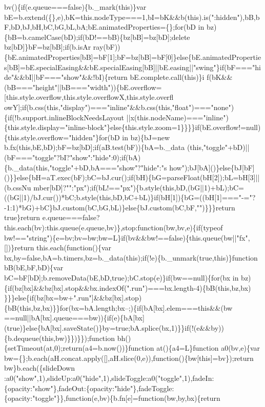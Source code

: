 \begin{DoxyCode}
{       bv()\{if(e.queue===false)\{b.\_mark(this)\}var
       bE=b.extend(\{\},e),bK=this.nodeType===1,bI=bK&&b(this).is(":hidden"),bB,bF,bD,bJ,bH,bC,bG,bL,bA;bE.animatedProperties=\{\};for(bD in bz)\{bB=b.camelCase(bD);if(bD!==bB)\{bz[bB]=bz[bD];delete
       bz[bD]\}bF=bz[bB];if(b.isAr
      ray(bF))\{bE.animatedProperties[bB]=bF[1];bF=bz[bB]=bF[0]\}else\{bE.animatedProperties[bB]=bE.specialEasing&&bE.specialEasing[bB]||bE.easing||"swing"\}if(bF==="hide"&&bI||bF==="show"&&!bI)\{return
       bE.complete.call(this)\}i
      f(bK&&(bB==="height"||bB==="width"))\{bE.overflow=[this.style.overflow,this.style.overflowX,this.style.overfl
      owY];if(b.css(this,"display")==="inline"&&b.css(this,"float")==="none")\{if(!b.support.inlineBlockNeedsLayout
      ||x(this.nodeName)==="inline")\{this.style.display="inline-block"\}else\{this.style.zoom=1\}\}\}\}if(bE.overflow!=null)\{this.style.overflow="hidden"\}for(bD in bz)\{bJ=new
       b.fx(this,bE,bD);bF=bz[bD];if(aB.test(bF))\{bA=b.\_data
      (this,"toggle"+bD)||(bF==="toggle"?bI?"show":"hide":0);if(bA)\{b.\_data(this,"toggle"+bD,bA==="show"?"hide":"s
      how");bJ[bA]()\}else\{bJ[bF]()\}\}else\{bH=aT.exec(bF);bC=bJ.cur();if(bH)\{bG=parseFloat(bH[2]);bL=bH[3]||(b.cssNu
      mber[bD]?"":"px");if(bL!=="px")\{b.style(this,bD,(bG||1)+bL);bC=((bG||1)/bJ.cur())*bC;b.style(this,bD,bC+bL)\}if(bH[1])\{bG=((bH[1]==="-="?-1:1)*bG)+bC\}bJ.custom(bC,bG,bL)\}else\{bJ.custom(bC,bF,"")\}\}\}return true\}return
       e.queue===false?this.each(bv):this.queue(e.queue,bv)\},stop:function(bw,bv,e)\{if(typeof
       bw!=="string")\{e=bv;bv=bw;bw=L\}if(bv&&bw!==false)\{this.queue(bw||"fx",[])\}return this.each(function()\{var
       bx,by=false,bA=b.timers,bz=b.\_data(this);if(!e)\{b.\_unmark(true,this)\}function bB(bE,bF,bD)\{var
       bC=bF[bD];b.removeData(bE,bD,true);bC.stop(e)\}if(bw==null)\{for(bx in
       bz)\{if(bz[bx]&&bz[bx].stop&&bx.indexOf(".run")===bx.length-4)\{bB(this,bz,bx)
      \}\}\}else\{if(bz[bx=bw+".run"]&&bz[bx].stop)\{bB(this,bz,bx)\}\}for(bx=bA.length;bx--;)\{if(bA[bx].elem===this&&(bw
      ==null||bA[bx].queue===bw))\{if(e)\{bA[bx](true)\}else\{bA[bx].saveState()\}by=true;bA.splice(bx,1)\}\}if(!(e&&by))\{b.dequeue(this,bw)\}\})\}\});function bh()\{setTimeout(at,0);return(a4=b.now())\}function at()\{a4=L\}function
       a0(bv,e)\{var bw=\{\};b.each(aH.concat.apply([],aH.slice(0,e)),function()\{bw[this]=bv\});return
       bw\}b.each(\{slideDown
      :a0("show",1),slideUp:a0("hide",1),slideToggle:a0("toggle",1),fadeIn:\{opacity:"show"\},fadeOut:\{opacity:"hide"\},fadeToggle:\{opacity:"toggle"\}\},function(e,bv)\{b.fn[e]=function(bw,by,bx)\{return
}
\end{DoxyCode}
